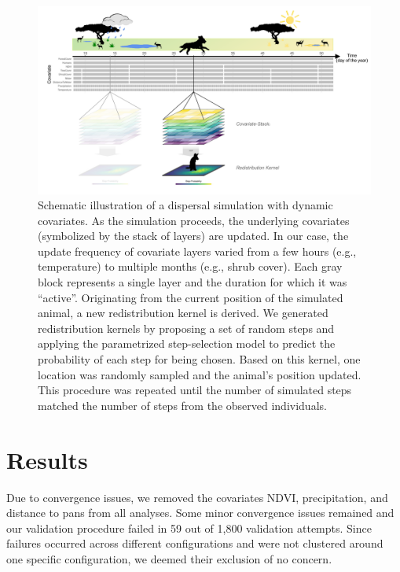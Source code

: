\documentclass[abstract=on,10pt,a4paper,bibliography=totocnumbered]{article}
\begin{document}
\begin{figure}
 \begin{center}
  \includegraphics[width = \textwidth]{Figures/Schematic} \caption{Schematic
  illustration of a dispersal simulation with dynamic covariates. As the
  simulation proceeds, the underlying covariates (symbolized by the stack of
  layers) are updated. In our case, the update frequency of covariate layers
  varied from a few hours (e.g., temperature) to multiple months (e.g., shrub
  cover). Each gray block represents a single layer and the duration for which
  it was ``active''. Originating from the current position of the simulated
  animal, a new redistribution kernel is derived. We generated redistribution
  kernels by proposing a set of random steps and applying the parametrized
  step-selection model to predict the probability of each step for being chosen.
  Based on this kernel, one location was randomly sampled and the animal's
  position updated. This procedure was repeated until the number of simulated
  steps matched the number of steps from the observed individuals.}
  \label{Schematic}
 \end{center}
\end{figure}

\section{Results}

Due to convergence issues, we removed the covariates NDVI, precipitation, and
distance to pans from all analyses. Some minor convergence issues remained and
our validation procedure failed in 59 out of 1,800 validation attempts. Since
failures occurred across different configurations and were not clustered around
one specific configuration, we deemed their exclusion of no concern.
\end{document}
